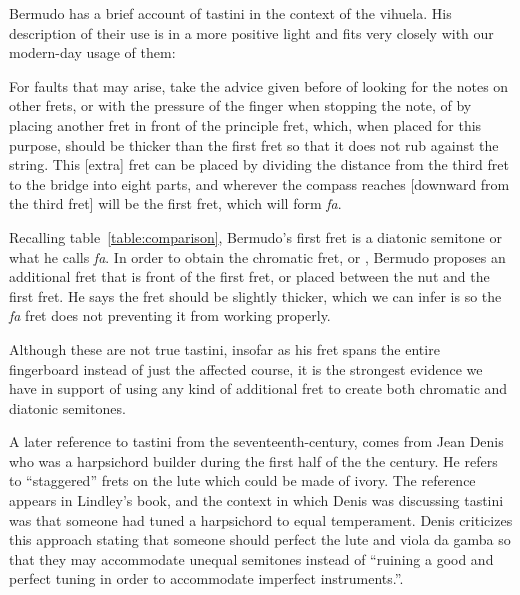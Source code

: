 Bermudo has a brief account of tastini in the context of the vihuela.  His description
of their use is in a more positive light and fits very closely with our modern-day
usage of them:
\begin{blocks}
For faults that may arise, take the advice given before of looking for the notes on other
frets, or with the pressure of the finger when stopping the note, of by placing another
fret in front of the principle fret, which, when placed for this purpose, should be
thicker than the first fret so that it does not rub against the string. This [extra]
fret can be placed by dividing the distance from the third fret to the bridge into eight
parts, and wherever the compass reaches [downward from the third fret] will be the first
fret, which will form \textit{fa}. \autocite[115-116]{DE:1}
\end{blocks}
Recalling table~\ref{table:comparison}, Bermudo's first fret is a diatonic semitone or what
he calls \textit{fa}.  In order to obtain the chromatic fret, or , Bermudo
proposes an additional fret that is front of the first fret, or placed between the nut
and the first fret.  He says the fret should be slightly thicker, which we can infer
is so the \textit{fa} fret does not preventing it from working properly.

Although these are not true tastini, insofar as his fret spans the entire
fingerboard instead of just the affected course, it is the strongest evidence we have
in support of using any kind of additional fret to create both chromatic and diatonic semitones.

A later reference to tastini from the seventeenth-century, comes from Jean Denis who
was a harpsichord builder during the first half of the the century.  He refers to
``staggered'' frets on the lute which could be made of ivory.  The reference appears in
Lindley's book, and the context in which Denis was discussing tastini was that
someone had tuned a harpsichord to equal temperament.  Denis criticizes this approach
stating that someone should perfect the lute and viola da gamba so that they may
accommodate unequal semitones instead of ``ruining a good and perfect tuning in order to
accommodate imperfect instruments.''\autocite[47]{ML:1}.

